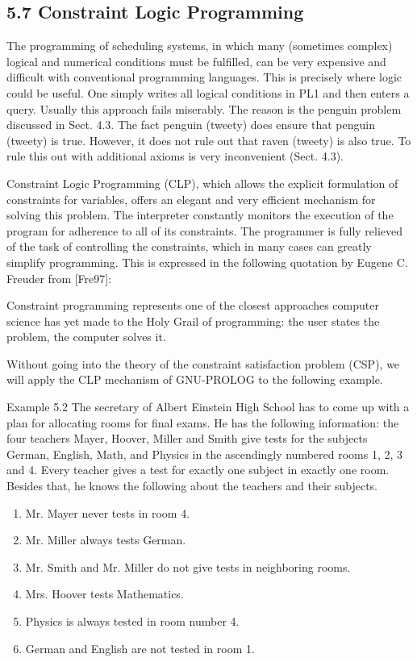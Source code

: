 \documentclass[10pt]{article}
\begin{document}
\subsection*{5.7 Constraint Logic Programming}
The programming of scheduling systems, in which many (sometimes complex) logical and numerical conditions must be fulfilled, can be very expensive and difficult with conventional programming languages. This is precisely where logic could be useful. One simply writes all logical conditions in PL1 and then enters a query. Usually this approach fails miserably. The reason is the penguin problem discussed in Sect. 4.3. The fact penguin (tweety) does ensure that penguin (tweety) is true. However, it does not rule out that raven (tweety) is also true. To rule this out with additional axioms is very inconvenient (Sect. 4.3).

Constraint Logic Programming (CLP), which allows the explicit formulation of constraints for variables, offers an elegant and very efficient mechanism for solving this problem. The interpreter constantly monitors the execution of the program for adherence to all of its constraints. The programmer is fully relieved of the task of controlling the constraints, which in many cases can greatly simplify programming. This is expressed in the following quotation by Eugene C. Freuder from [Fre97]:

\begin{displayquote}
Constraint programming represents one of the closest approaches computer science has yet made to the Holy Grail of programming: the user states the problem, the computer solves it.
\end{displayquote}

Without going into the theory of the constraint satisfaction problem (CSP), we will apply the CLP mechanism of GNU-PROLOG to the following example.

Example 5.2 The secretary of Albert Einstein High School has to come up with a plan for allocating rooms for final exams. He has the following information: the four teachers Mayer, Hoover, Miller and Smith give tests for the subjects German, English, Math, and Physics in the ascendingly numbered rooms 1, 2, 3 and 4. Every teacher gives a test for exactly one subject in exactly one room. Besides that, he knows the following about the teachers and their subjects.

\begin{enumerate}
  \item Mr. Mayer never tests in room 4.
  \item Mr. Miller always tests German.
  \item Mr. Smith and Mr. Miller do not give tests in neighboring rooms.
  \item Mrs. Hoover tests Mathematics.
  \item Physics is always tested in room number 4.
  \item German and English are not tested in room 1.
\end{enumerate}
\end{document}
